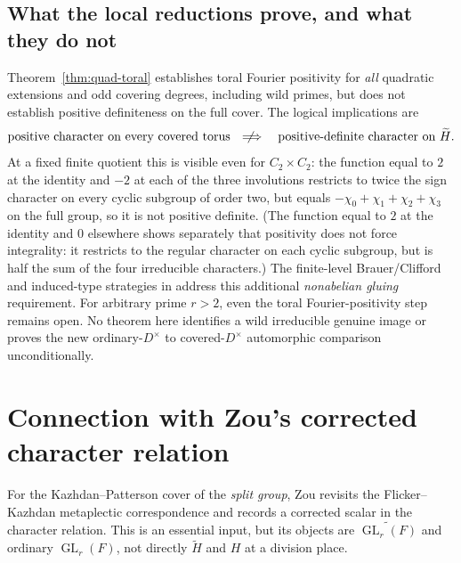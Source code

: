 \documentclass[11pt]{article}
\newcommand{\GL}{\operatorname{GL}}
\newcommand{\tH}{\widetilde H}
\theoremstyle{plain}
\theoremstyle{definition}
\begin{document}
\subsection{What the local reductions prove, and what they do not}
\label{subsec:strategywild}
Theorem~\ref{thm:quad-toral} establishes toral Fourier positivity
for \emph{all} quadratic extensions and odd covering degrees,
including wild primes, but does not establish positive
definiteness on the full cover.  The logical implications are
\[
\text{positive character on every covered torus}
\quad\not\!\!\Longrightarrow\quad
\text{positive-definite character on }\tH.
\]
At a fixed finite quotient this is visible even for
$C_2\times C_2$: the function equal to $2$ at the identity
and $-2$ at each of the three involutions restricts to twice
the sign character on every cyclic subgroup of order two, but
equals $-\chi_0+\chi_1+\chi_2+\chi_3$ on the full group, so it
is not positive definite.  (The function equal to $2$ at the
identity and $0$ elsewhere shows separately that positivity
does not force integrality: it restricts to the regular
character on each cyclic subgroup, but is half the sum of the
four irreducible characters.)
The finite-level Brauer/Clifford and induced-type strategies in
\cite{RankTwo0} address this additional \emph{nonabelian gluing}
requirement.  For arbitrary prime $r>2$, even the toral
Fourier-positivity step remains open.
No theorem here identifies a wild irreducible genuine image or
proves the new ordinary-$D^\times$ to covered-$D^\times$
automorphic comparison unconditionally.

\section{Connection with Zou's corrected character relation}\label{sec:Zou}
For the Kazhdan--Patterson cover of the \emph{split group},
Zou \cite[\S3]{Zou24} revisits the Flicker--Kazhdan metaplectic
correspondence and records a corrected scalar in the character
relation.  This is an essential input, but its objects are
$\widetilde{\GL_r(F)}$ and ordinary $\GL_r(F)$, not directly
$\tH$ and $H$ at a division place.
\end{document}
